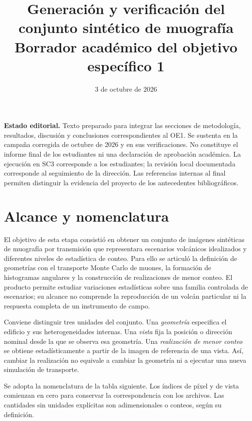 \documentclass[11pt,a4paper]{article}
\title{Generación y verificación del conjunto sintético de muografía\\Borrador académico del objetivo específico 1}
\author{}
\date{3 de octubre de 2026}
\begin{document}
\maketitle

\noindent\textbf{Estado editorial.} Texto preparado para integrar las secciones de metodología, resultados, discusión y conclusiones correspondientes al OE1. Se sustenta en la campaña corregida de octubre de 2026 y en sus verificaciones. No constituye el informe final de los estudiantes ni una declaración de aprobación académica. La ejecución en SC3 corresponde a los estudiantes; la revisión local documentada corresponde al seguimiento de la dirección. Las referencias internas al final permiten distinguir la evidencia del proyecto de los antecedentes bibliográficos.

\tableofcontents

\section{Alcance y nomenclatura}

El objetivo de esta etapa consistió en obtener un conjunto de imágenes sintéticas de muografía por transmisión que representara escenarios volcánicos idealizados y diferentes niveles de estadística de conteo. Para ello se articuló la definición de geometrías con el transporte Monte Carlo de muones, la formación de histogramas angulares y la construcción de realizaciones de menor conteo. El producto permite estudiar variaciones estadísticas sobre una familia controlada de escenarios; su alcance no comprende la reproducción de un volcán particular ni la respuesta completa de un instrumento de campo.

Conviene distinguir tres unidades del conjunto. Una \emph{geometría} especifica el edificio y sus heterogeneidades internas. Una \emph{vista} fija la posición o dirección nominal desde la que se observa esa geometría. Una \emph{realización de menor conteo} se obtiene estadísticamente a partir de la imagen de referencia de una vista. Así, cambiar la realización no equivale a cambiar la geometría ni a ejecutar una nueva simulación de transporte.

Se adopta la nomenclatura de la tabla siguiente. Los índices de píxel y de vista comienzan en cero para conservar la correspondencia con los archivos. Las cantidades sin unidades explícitas son adimensionales o conteos, según su definición.
\end{document}
